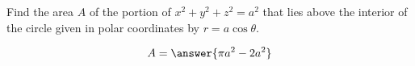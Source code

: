 \documentclass{ximera}
\author{David Guichard \and Neal Koblitz \and H. Jerome Keisler \and Albert Scheller \and Barry Balof \and Mike Wills \and Matthew Carr}
\begin{document}
\begin{exercise}




Find the area $A$ of the portion of $x^2+y^2+z^2=a^2$ that lies above the interior of the circle given in polar coordinates by $r=a\cos\theta$.

\begin{prompt}
\[
A=\answer{\pi a^2-2a^2}
\]
\end{prompt}


\end{exercise}
\end{document}
